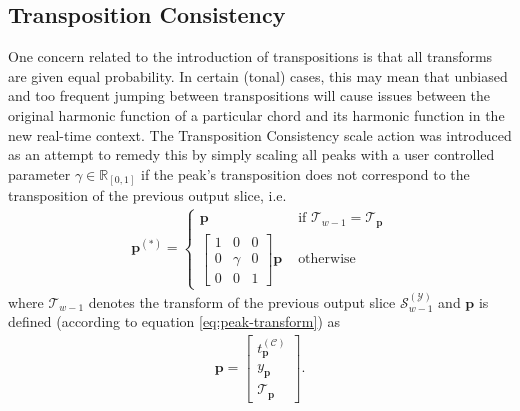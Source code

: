 \subsection{Transposition Consistency}
One concern related to the introduction of transpositions is that all transforms are given equal probability. In certain (tonal) cases, this may mean that unbiased and too frequent jumping between transpositions will cause issues between the original harmonic function of a particular chord and its harmonic function in the new real-time context. The Transposition Consistency scale action was introduced as an attempt to remedy this by simply scaling all peaks with a user controlled parameter $\gamma \in \mathbb R_{[0, 1]}$ if the peak's transposition does not correspond to the transposition of the previous output slice, i.e.
	\begin{align}
		\bm p^{(\ast)} = \left\lbrace\begin{array}{cl}
				\bm p & \text{ if } \mathcal T_{w-1} = \mathcal T_{\bm p}\\
				\begin{bmatrix} 
					1 & 0 & 0 \\
					0 & \gamma & 0\\
					0 & 0 & 1
				\end{bmatrix} \bm p & \text{ otherwise}
			\end{array}\right.
	\end{align}
	where $\mathcal T_{w-1}$ denotes the transform of the previous output slice $\mathcal S^{(\mathcal Y)}_{w-1}$ and $\bm p$ is defined (according to equation \ref{eq:peak-transform}) as
	\begin{align}
		\bm p = \begin{bmatrix} 
			t^{(\mathcal C)}_{\bm p} \\ y_{\bm p} \\ \mathcal T_{\bm p} 
		\end{bmatrix}.
	\end{align}


